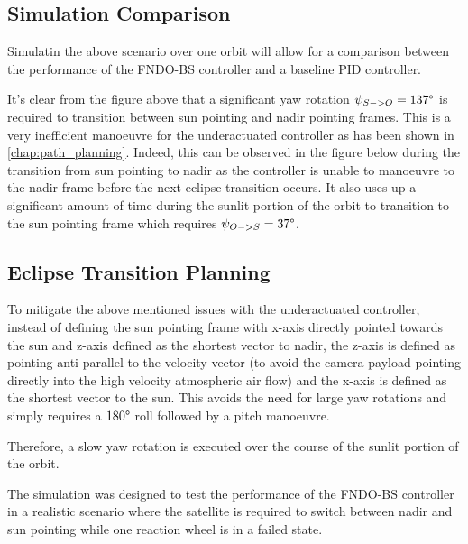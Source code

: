 \subsection{Simulation Comparison}

Simulatin the above scenario over one orbit will allow for a comparison between the performance of the FNDO-BS controller and a baseline PID controller.



It's clear from the figure above that a significant yaw rotation $\psi_{S->O}=137\degree$ is required to transition between sun pointing and nadir pointing frames. This is a very inefficient manoeuvre for the underactuated controller as has been shown in \autoref{chap:path_planning}. Indeed, this can be observed in the figure below during the transition from sun pointing to nadir as the controller is unable to manoeuvre to the nadir frame before the next eclipse transition occurs. It also uses up a significant amount of time during the sunlit portion of the orbit to transition to the sun pointing frame which requires $\psi_{O->S}=37\degree$.




\subsection{Eclipse Transition Planning}

To mitigate the above mentioned issues with the underactuated controller, instead of defining the sun pointing frame with x-axis directly pointed towards the sun and z-axis defined as the shortest vector to nadir, the z-axis is defined as pointing anti-parallel to the velocity vector (to avoid the camera payload pointing directly into the high velocity atmospheric air flow) and the x-axis is defined as the shortest vector to the sun. This avoids the need for large yaw rotations and simply requires a $180\degree$ roll followed by a pitch manoeuvre.

Therefore, a slow yaw rotation is executed over the course of the sunlit portion of the orbit.


The simulation was designed to test the performance of the FNDO-BS controller in a realistic scenario where the satellite is required to switch between nadir and sun pointing while one reaction wheel is in a failed state. 

